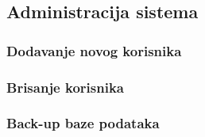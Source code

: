 \subsection{Administracija sistema}

\subsubsection{Dodavanje novog korisnika}

\subsubsection{Brisanje korisnika}

\subsubsection{Back-up baze podataka}
